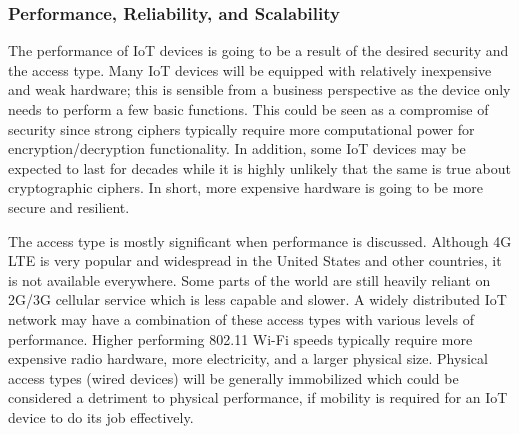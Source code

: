 \subsubsection{Performance, Reliability, and Scalability}
The performance of IoT devices is going to be a result of the desired security
and the access type. Many IoT devices will be equipped with relatively
inexpensive and weak hardware; this is sensible from a business perspective as
the device only needs to perform a few basic functions. This could be seen as
a compromise of security since strong ciphers typically require more
computational power for encryption/decryption functionality. In addition, some
IoT devices may be expected to last for decades while it is highly unlikely
that the same is true about cryptographic ciphers. In short, more expensive
hardware is going to be more secure and resilient.

The access type is mostly significant when performance is discussed. Although
4G LTE is very popular and widespread in the United States and other
countries, it is not available everywhere. Some parts of the world are still
heavily reliant on 2G/3G cellular service which is less capable and slower. A
widely distributed IoT network may have a combination of these access types
with various levels of performance. Higher performing 802.11 Wi-Fi speeds
typically require more expensive radio hardware, more electricity, and a
larger physical size. Physical access types (wired devices) will be generally
immobilized which could be considered a detriment to physical performance, if
mobility is required for an IoT device to do its job effectively.
